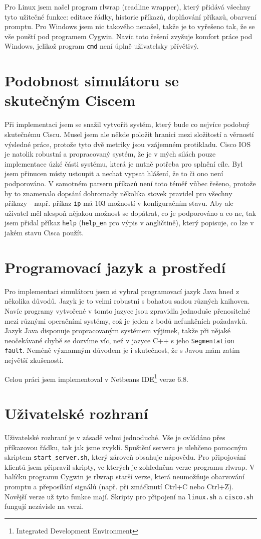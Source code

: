 Pro Linux jsem našel program rlwrap (readline wrapper), který přidává všechny tyto užitečné funkce: editace řádky, historie příkazů, doplňování příkazů, obarvení promptu. Pro Windows jsem nic takového nenašel, takže je to vyřešeno tak, že se vše pouští pod programem Cygwin. Navíc toto řešení zvyšuje komfort práce pod Windows, jelikož program \verb|cmd| není úplně uživatelsky přívětivý.


\section{Podobnost simulátoru se skutečným Ciscem}
Při implementaci jsem se snažil vytvořit systém, který bude co nejvíce podobný skutečnému Ciscu. Musel jsem ale někde položit hranici mezi složitostí a věrností výsledné práce, protože tyto dvě metriky jsou vzájemném protikladu. Cisco IOS je natolik robustní a propracovaný systém, že je v mých silách pouze implementace úzké části systému, která je nutně potřeba pro splnění cíle. Byl jsem přinucen místy ustoupit a nechat vypsat hlášení, že to či ono není podporováno. V samotném parseru příkazů není toto téměř vůbec řešeno, protože by to znamenalo dopsání dohromady několika stovek pravidel pro všechny příkazy - např. příkaz \verb|ip| má 103 možností v konfiguračním stavu. Aby ale uživatel měl alespoň nějakou možnost se dopátrat, co je podporováno a co ne, tak jsem přidal příkaz \verb|help| (\verb|help_en| pro výpis v angličtině), který popisuje, co lze v jakém stavu Cisca použít.


\section{Programovací jazyk a prostředí}
Pro implementaci simulátoru jsem si vybral programovací jazyk Java hned z několika důvodů. Jazyk je to velmi robustní s bohatou sadou různých knihoven. Navíc programy vytvořené v tomto jazyce jsou zpravidla jednoduše přenositelné mezi různými operačními systémy, což je jeden z bodů nefunkčních požadavků. Jazyk Java disponuje propracovaným systémem výjimek, takže při nějaké neočekávané chybě se dozvíme víc, než v jazyce C++ s jeho \verb|Segmentation fault|. Neméně významným důvodem je i skutečnost, že s Javou mám zatím největší zkušenosti.

Celou práci jsem implementoval v Netbeans IDE\footnote{Integrated Development Environment} verze 6.8.


\section{Uživatelské rozhraní}
Uživatelské rozhraní je v zásadě velmi jednoduché. Vše je ovládáno přes příkazovou řádku, tak jak jsme zvyklí. Spuštění serveru je ulehčeno pomocným skriptem \verb|start_server.sh|, který zároveň obsahuje nápovědu. Pro připojování klientů jsem připravil skripty, ve kterých je zohledněna verze programu rlwrap. V balíčku programu Cygwin je rlwrap starší verze, která neumožňuje obarvování promptu a přeposílání signálů (např. při zmáčknutí Ctrl+C nebo Ctrl+Z). Novější verze už tyto funkce mají. Skripty pro připojení na \verb|linux.sh| a \verb|cisco.sh| fungují nezávisle na verzi.

